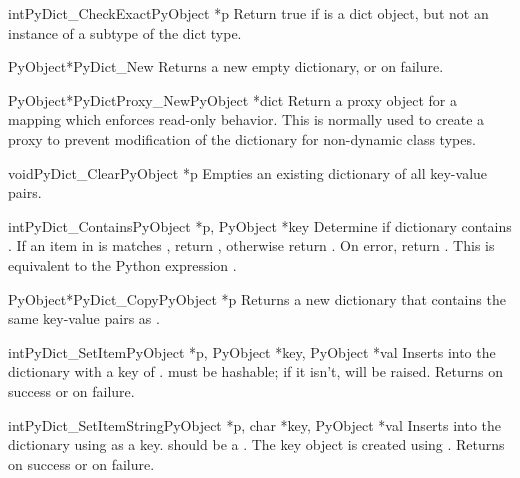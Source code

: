 \begin{cfuncdesc}{int}{PyDict_CheckExact}{PyObject *p}
  Return true if  is a dict object, but not an instance of a
  subtype of the dict type.
\end{cfuncdesc}

\begin{cfuncdesc}{PyObject*}{PyDict_New}{}
  Returns a new empty dictionary, or \NULL{} on failure.
\end{cfuncdesc}

\begin{cfuncdesc}{PyObject*}{PyDictProxy_New}{PyObject *dict}
  Return a proxy object for a mapping which enforces read-only
  behavior.  This is normally used to create a proxy to prevent
  modification of the dictionary for non-dynamic class types.
\end{cfuncdesc}

\begin{cfuncdesc}{void}{PyDict_Clear}{PyObject *p}
  Empties an existing dictionary of all key-value pairs.
\end{cfuncdesc}

\begin{cfuncdesc}{int}{PyDict_Contains}{PyObject *p, PyObject *key}
  Determine if dictionary  contains .  If an item
  in  is matches , return , otherwise return
  .  On error, return .  This is equivalent to the
  Python expression .
\end{cfuncdesc}

\begin{cfuncdesc}{PyObject*}{PyDict_Copy}{PyObject *p}
  Returns a new dictionary that contains the same key-value pairs as
  .
\end{cfuncdesc}

\begin{cfuncdesc}{int}{PyDict_SetItem}{PyObject *p, PyObject *key,
                                       PyObject *val}
  Inserts  into the dictionary  with a key of
  .   must be hashable; if it isn't,
   will be raised.
  Returns  on success or  on failure.
\end{cfuncdesc}

\begin{cfuncdesc}{int}{PyDict_SetItemString}{PyObject *p,
            char *key,
            PyObject *val}
  Inserts  into the dictionary  using  as a
  key.  should be a .  The key object is created
  using . Returns  on
  success or  on failure.
\end{cfuncdesc}

